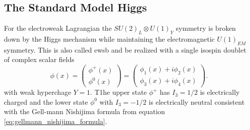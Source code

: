 \subsection*{The Standard Model Higgs}
For the electroweak Lagrangian the $SU(2)_L \otimes U(1)_Y$ symmetry is broken down by the Higgs mechanism while maintaining the electromagnetic $U(1)_{EM}$ symmetry. This is also called \ac{ewsb} and be realized with a single isospin doublet of complex scalar fields
\begin{equation}
    \phi(x)=
    \begin{pmatrix}
        \phi^+(x) \\
        \phi^0(x)
    \end{pmatrix}
    =
    \begin{pmatrix}
        \phi_1 (x)+i \phi_2 (x) \\
        \phi_3 (x)+i \phi_4 (x)
    \end{pmatrix}.
\end{equation}
with weak hyperchage $Y=1$. T1he upper state $\phi^+$ has $I_3=1/2$ is electrically charged and the lower state $\phi^0$ with $I_3=-1/2$ is electrically neutral consistent with the Gell-mann Nishijima formula from equation \ref{eq:gellmann_nishijima_formula}.



